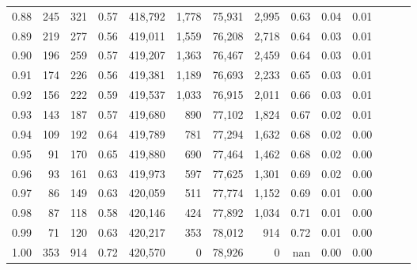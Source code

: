 \begin{tabular}{rrrrrrrrrrrrrr}
0.88 &     245 &    321 &  0.57 &  418,792 &    1,778 &  75,931 &   2,995 &  0.63 &  0.04 &      0.01 \\
0.89 &     219 &    277 &  0.56 &  419,011 &    1,559 &  76,208 &   2,718 &  0.64 &  0.03 &      0.01 \\
0.90 &     196 &    259 &  0.57 &  419,207 &    1,363 &  76,467 &   2,459 &  0.64 &  0.03 &      0.01 \\
0.91 &     174 &    226 &  0.56 &  419,381 &    1,189 &  76,693 &   2,233 &  0.65 &  0.03 &      0.01 \\
0.92 &     156 &    222 &  0.59 &  419,537 &    1,033 &  76,915 &   2,011 &  0.66 &  0.03 &      0.01 \\
0.93 &     143 &    187 &  0.57 &  419,680 &      890 &  77,102 &   1,824 &  0.67 &  0.02 &      0.01 \\
0.94 &     109 &    192 &  0.64 &  419,789 &      781 &  77,294 &   1,632 &  0.68 &  0.02 &      0.00 \\
0.95 &      91 &    170 &  0.65 &  419,880 &      690 &  77,464 &   1,462 &  0.68 &  0.02 &      0.00 \\
0.96 &      93 &    161 &  0.63 &  419,973 &      597 &  77,625 &   1,301 &  0.69 &  0.02 &      0.00 \\
0.97 &      86 &    149 &  0.63 &  420,059 &      511 &  77,774 &   1,152 &  0.69 &  0.01 &      0.00 \\
0.98 &      87 &    118 &  0.58 &  420,146 &      424 &  77,892 &   1,034 &  0.71 &  0.01 &      0.00 \\
0.99 &      71 &    120 &  0.63 &  420,217 &      353 &  78,012 &     914 &  0.72 &  0.01 &      0.00 \\
1.00 &     353 &    914 &  0.72 &  420,570 &        0 &  78,926 &       0 &   nan &  0.00 &      0.00 \\
\bottomrule
\end{tabular}

